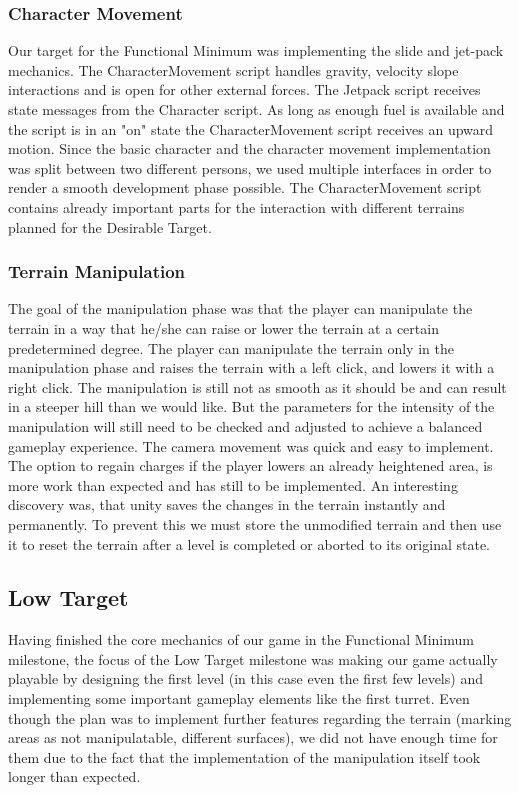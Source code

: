 \documentclass[12pt, letterpaper]{scrartcl}
\begin{document}
	\subsubsection{Character Movement}
	Our target for the Functional Minimum was implementing the slide and jet-pack mechanics. The CharacterMovement script handles gravity, velocity slope interactions and is open for other external forces. The Jetpack script receives state messages from the Character script. As long as enough fuel is available and the script is in an "on" state the CharacterMovement script receives an upward motion. Since the basic character and the character movement implementation was split between two different persons, we used multiple interfaces in order to render a smooth development phase possible.
	The CharacterMovement script contains already important parts for the interaction with different terrains planned for the Desirable Target.
	
	\subsubsection{Terrain Manipulation}
	The goal of the manipulation phase was that the player can manipulate the terrain in a way that he/she can raise or lower the terrain at a certain predetermined degree. The player can manipulate the terrain only in the manipulation phase and raises the terrain with a left click, and lowers it with a right click. The manipulation is still not as smooth as it should be and can result in a steeper hill than we would like. But the parameters for the intensity of the manipulation will still need to be checked and adjusted to achieve a balanced gameplay experience. The camera movement was quick and easy to implement. The option to regain charges if the player lowers an already heightened area, is more work than expected and has still to be implemented. An interesting discovery was, that unity saves the changes in the terrain instantly and permanently. To prevent this we must store the unmodified terrain and then use it to reset the terrain after a level is completed or aborted to its original state.
	
	
	\subsection{Low Target}
	Having finished the core mechanics of our game in the Functional Minimum milestone, the focus of the Low Target milestone was making our game actually playable by designing the first level (in this case even the first few levels) and implementing some important gameplay elements like the first turret. Even though the plan was to implement further features regarding the terrain (marking areas as not manipulatable, different surfaces), we did not have enough time for them due to the fact that the implementation of the manipulation itself took longer than expected.
	
\end{document}
